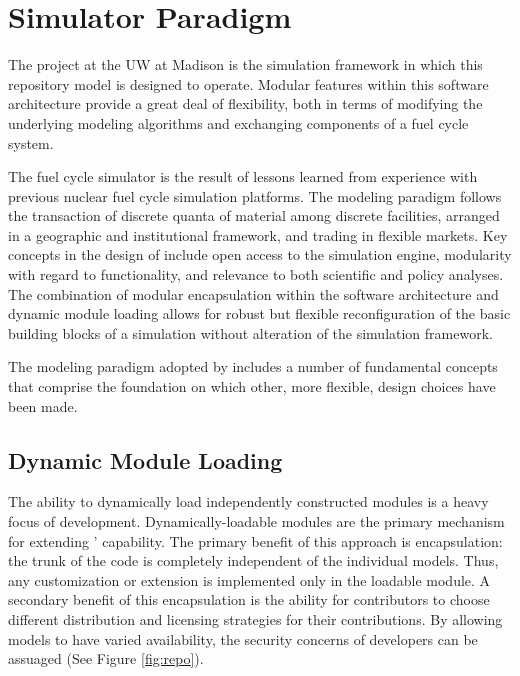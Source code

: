 \section{\Cyclus Simulator Paradigm }

The \Cyclus project at the \gls{UW} at Madison is the 
simulation framework in which this repository model is designed to 
operate.  Modular features within this software architecture provide a 
great deal of flexibility, both in terms of modifying the underlying 
modeling algorithms and exchanging components of a fuel cycle system.

The \Cyclus fuel cycle simulator is the  result of lessons learned 
from experience with previous nuclear fuel cycle simulation platforms.  
The modeling paradigm follows the transaction of discrete quanta of 
material among discrete facilities, arranged in a geographic and 
institutional framework, and trading in
flexible markets. Key concepts in the design of \Cyclus include open
access to the simulation engine, modularity with regard to
functionality, and relevance to both scientific and policy
analyses. The combination of modular encapsulation within the
software architecture and dynamic module loading allows for robust but 
flexible reconfiguration of the basic building blocks of a simulation 
without alteration of the simulation framework.  

The modeling paradigm adopted by \Cyclus includes a number of
fundamental concepts that comprise the foundation on which other, more
flexible, design choices have been made. 

\subsection{Dynamic Module Loading}

The ability to dynamically load independently constructed modules is a
heavy focus of \Cyclus development. Dynamically-loadable modules are
the primary mechanism for extending \Cyclus' capability. The primary
benefit of this approach is encapsulation: the trunk of the code is
completely independent of the individual models. Thus, any
customization or extension is implemented only in the loadable
module. A secondary benefit of this encapsulation is the ability for
contributors to choose different distribution and licensing strategies
for their contributions. By allowing models to have varied
availability, the security concerns of developers can be
assuaged (See Figure \ref{fig:repo}). 

